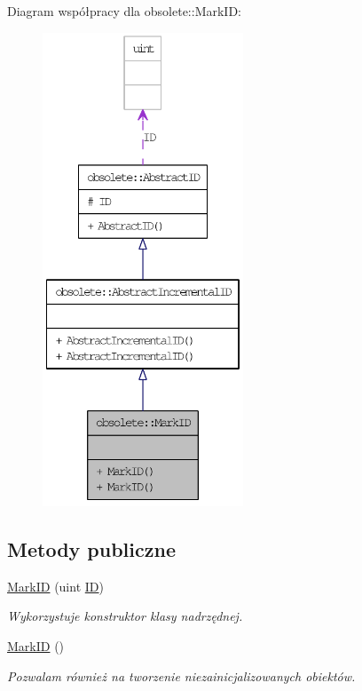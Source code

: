 Diagram współpracy dla obsolete::MarkID:\nopagebreak
\begin{figure}[H]
\begin{center}
\leavevmode
\includegraphics[height=400pt]{classobsolete_1_1MarkID__coll__graph}
\end{center}
\end{figure}
\subsection*{Metody publiczne}
\begin{DoxyCompactItemize}
\item 
\hyperlink{classobsolete_1_1MarkID_a451629e8562c9b4283835873d0416966}{MarkID} (uint \hyperlink{classobsolete_1_1ID}{ID})
\begin{DoxyCompactList}\small\item\em Wykorzystuje konstruktor klasy nadrzędnej. \item\end{DoxyCompactList}\item 
\hyperlink{classobsolete_1_1MarkID_a255fecd21149b8421bab3be478b821c9}{MarkID} ()
\begin{DoxyCompactList}\small\item\em Pozwalam również na tworzenie niezainicjalizowanych obiektów. \item\end{DoxyCompactList}\end{DoxyCompactItemize}
